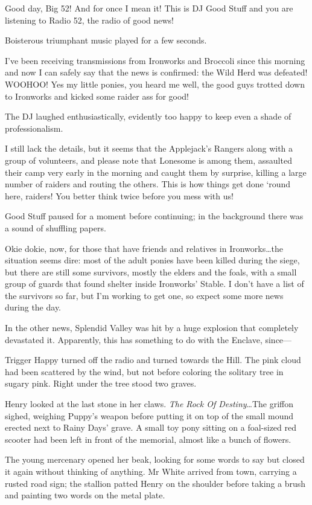 {\rt Good day, Big 52! And for once I mean it! This is DJ Good Stuff and you are listening to Radio 52, the radio of good news!}

Boisterous triumphant music played for a few seconds.

{\rt I've been receiving transmissions from Ironworks and Broccoli since this morning  and now I can safely say that the news is confirmed: the Wild Herd was defeated! WOOHOO! Yes my little ponies, you heard me well, the good guys trotted down to Ironworks and kicked some raider ass for good!}

The DJ laughed enthusiastically, evidently too happy to keep even a shade of professionalism.

{\rt I still lack the details, but it seems that the Applejack's Rangers along with a group of volunteers, and please note that Lonesome is among them, assaulted their camp very early in the morning and caught them by surprise, killing a large number of raiders and routing the others. This is how things get done `round here, raiders! You better think twice before you mess with us!}

Good Stuff paused for a moment before continuing; in the background there was a sound of shuffling papers.

{\rt Okie dokie, now, for those that have friends and relatives in Ironworks\dots the situation seems dire: most of the adult ponies have been killed during the siege, but there are still some survivors, mostly the elders and the foals, with a small group of guards that found shelter inside Ironworks' Stable. I don't have a list of the survivors so far, but I'm working to get one, so expect some more news during the day.}

{\rt In the other news, Splendid Valley was hit by a huge explosion that completely devastated it. Apparently, this has something to do with the Enclave, since---}

Trigger Happy turned off the radio and turned towards the Hill. The pink cloud had been scattered by the wind, but not before coloring the solitary tree in sugary pink. Right under the tree stood two graves.

Henry looked at the last stone in her claws. \emph{The Rock Of Destiny}\dots The griffon sighed, weighing Puppy's weapon before putting it on top of the small mound erected next to Rainy Days' grave. A small toy pony sitting on a foal-sized red scooter had been left in front of the memorial, almost like a bunch of flowers.

The young mercenary opened her beak, looking for some words to say but closed it again without thinking of anything. Mr White arrived from town, carrying a rusted road sign; the stallion patted Henry on the shoulder before taking a brush and painting two words on the metal plate.

